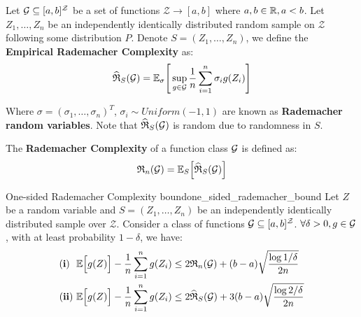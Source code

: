 \begin{definition}
    Let $\mathcal{G}\subseteq[a,b]^{\mathcal{Z}}$ be a set of functions $\mathcal{Z} \to [a, b]$ where $a,b\in\mathbb{R}, a < b$. Let $Z_1, \dots, Z_n$ be an independently identically distributed random sample on $\mathcal{Z}$ following some distribution $P$. Denote $S=(Z_1, \dots, Z_n)$, we define the \textbf{Empirical Rademacher Complexity} as:
    \begin{align*}
        \widehat{\mathfrak{R}}_S(\mathcal{G}) = \mathbb{E}_\sigma\Bigg[ 
            \sup_{g\in\mathcal{G}} \frac{1}{n}\sum_{i=1}^n \sigma_i g(Z_i)
         \Bigg]
    \end{align*}

    \noindent Where $\sigma=(\sigma_1, \dots, \sigma_n)^T$, $\sigma_i\sim Uniform(-1, 1)$ are known as \textbf{Rademacher random variables}. Note that $\widehat{\mathfrak{R}}_S(\mathcal{G})$ is random due to randomness in $S$.
\end{definition}

\begin{definition}
    The \textbf{Rademacher Complexity} of a function class $\mathcal{G}$ is defined as:
    \begin{align*}
        \mathfrak{R}_n(\mathcal{G}) = \mathbb{E}_S\Big[  \widehat{\mathfrak{R}}_S(\mathcal{G})  \Big]
    \end{align*}
\end{definition}

\begin{theorem}{One-sided Rademacher Complexity bound}{one_sided_rademacher_bound}
    Let $Z$ be a random variable and $S=(Z_1, \dots, Z_n)$ be an independently identically distributed sample over $\mathcal{Z}$. Consider a class of functions $\mathcal{G}\subseteq [a,b]^\mathcal{Z}$. $\forall \delta > 0, g\in\mathcal{G}$, with at least probability $1-\delta$, we have:
    \begin{align*}
        {\bf (i)} \ \ \mathbb{E}\Big[ g(Z) \Big] - \frac{1}{n} \sum_{i=1}^n g(Z_i) &\le 2\mathfrak{R}_n(\mathcal{G}) + (b-a)\sqrt{\frac{\log1/\delta}{2n}} \\
        {\bf (ii)} \  \mathbb{E}\Big[ g(Z) \Big] - \frac{1}{n} \sum_{i=1}^n g(Z_i) &\le 2\widehat{\mathfrak{R}}_S(\mathcal{G}) + 3(b-a)\sqrt{\frac{\log2/\delta}{2n}}
    \end{align*}
\end{theorem}

